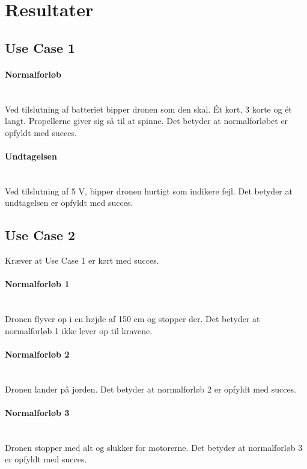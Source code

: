 \documentclass[Main]{subfiles}
\begin{document}
\section{Resultater}

\subsection{Use Case 1}
\paragraph{Normalforløb}\mbox{}\\
Ved tilslutning af batteriet bipper dronen som den skal. 
Ét kort, 3 korte og ét langt. 
Propellerne giver sig så til at spinne. 
Det betyder at normalforløbet er opfyldt med succes.

\paragraph{Undtagelsen}\mbox{}\\
Ved tilslutning af 5 V, bipper dronen hurtigt som indikere fejl.
Det betyder at undtagelsen er opfyldt med succes.

\subsection{Use Case 2}

Kræver at Use Case 1 er kørt med succes.

\paragraph{Normalforløb 1}\mbox{}\\
Dronen flyver op i en højde af 150 cm og stopper der. 
Det betyder at normalforløb 1 ikke lever op til kravene.

\paragraph{Normalforløb 2}\mbox{}\\
Dronen lander på jorden.
Det betyder at normalforløb 2 er opfyldt med succes.

\paragraph{Normalforløb 3}\mbox{}\\
Dronen stopper med alt og slukker for motorerne.
Det betyder at normalforløb 3 er opfyldt med succes.
\end{document}
